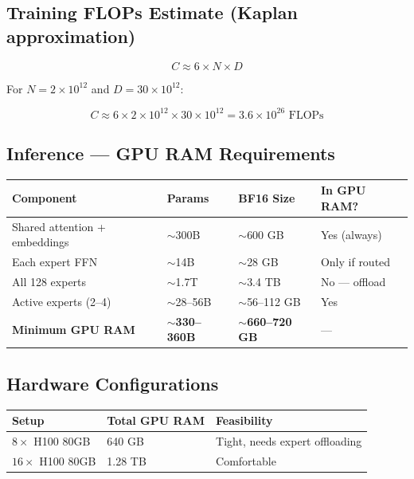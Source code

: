\documentclass[11pt,a4paper]{article}
\begin{document}
\subsection{Training FLOPs Estimate (Kaplan approximation)}

$$C \approx 6 \times N \times D$$

For $N = 2 \times 10^{12}$ and $D = 30 \times 10^{12}$:

$$C \approx 6 \times 2 \times 10^{12} \times 30 \times 10^{12} = 3.6 \times 10^{26} \text{ FLOPs}$$

\subsection{Inference --- GPU RAM Requirements}

\begin{center}
\begin{tabular}{llll}
\toprule
\textbf{Component} & \textbf{Params} & \textbf{BF16 Size} & \textbf{In GPU RAM?} \\
\midrule
Shared attention + embeddings & $\sim$300B & $\sim$600 GB & Yes (always) \\
Each expert FFN & $\sim$14B & $\sim$28 GB & Only if routed \\
All 128 experts & $\sim$1.7T & $\sim$3.4 TB & No --- offload \\
Active experts (2--4) & $\sim$28--56B & $\sim$56--112 GB & Yes \\
\textbf{Minimum GPU RAM} & $\sim$\textbf{330--360B} & $\sim$\textbf{660--720 GB} & --- \\
\bottomrule
\end{tabular}
\end{center}

\subsection{Hardware Configurations}

\begin{center}
\begin{tabular}{lll}
\toprule
\textbf{Setup} & \textbf{Total GPU RAM} & \textbf{Feasibility} \\
\midrule
$8\times$ H100 80GB & 640 GB & Tight, needs expert offloading \\
$16\times$ H100 80GB & 1.28 TB & Comfortable \\
\bottomrule
\end{tabular}
\end{center}
\end{document}
